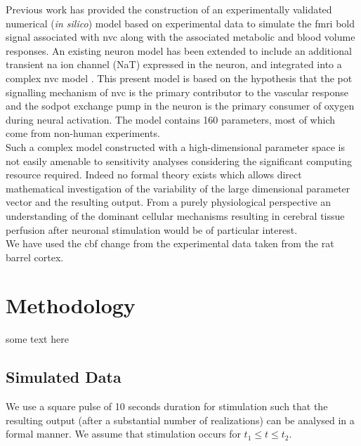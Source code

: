 \documentclass[12pt]{article}
\numberwithin{equation}{section}
\begin{document}
Previous work \cite{Mathias2018} has provided  the construction of an experimentally validated numerical (\textit{in silico}) model based on experimental data to simulate the \gls{fmri} \gls{bold} signal associated with \gls{nvc} along with the associated metabolic and blood volume responses. An existing neuron model \citep{Mathias2017, Mathias2017a} has been extended to include an additional transient \gls{na} ion channel (NaT) expressed in the neuron, and integrated into a complex \gls{nvc} model \citep{Dormanns2015, Dormanns2016, Kenny2017a}. This present model is based on the hypothesis that the \gls{pot} signalling mechanism of \gls{nvc} is the primary contributor to the vascular response and the \gls{sodpot} exchange pump in the neuron is the primary consumer of oxygen during neural activation. The model contains 160 parameters, most of which come from non-human experiments. \\
Such a complex model constructed with a high-dimensional parameter space is not easily amenable to sensitivity analyses considering the significant computing resource required. Indeed no formal theory exists which allows direct mathematical investigation of the variability of the large dimensional parameter vector and the resulting output. 
From a purely physiological perspective an understanding of the dominant cellular mechanisms resulting in cerebral tissue perfusion after neuronal stimulation would be of particular interest. \\
  
  We have used the \gls{cbf} change from the experimental data \cite{Zheng2010} taken from the rat barrel cortex. 
\section{Methodology}
some text here
\subsection{Simulated Data}
We use a square pulse of 10 seconds duration for stimulation such that the resulting output (after a substantial number of realizations) can be analysed in a formal manner. We assume that stimulation occurs for $t_1\le t \le t_2$.  
\end{document}

